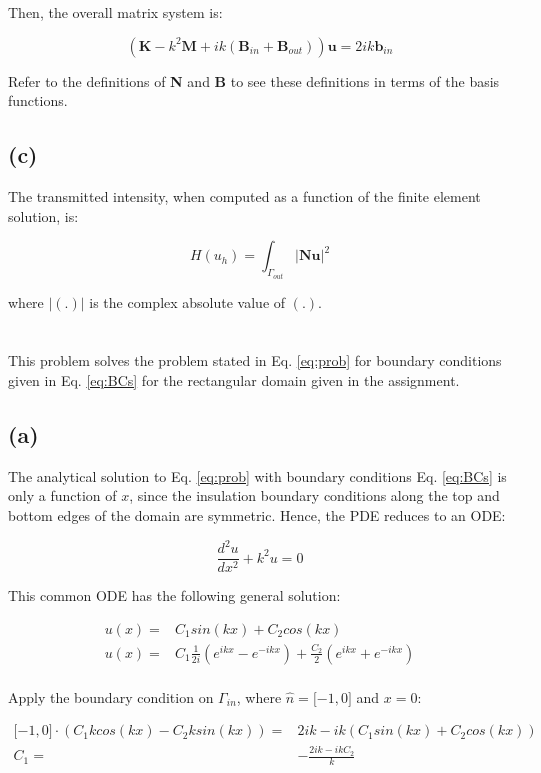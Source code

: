 \documentclass[10pt]{article}
\newcommand{\beq}{\begin{equation}}
\newcommand{\eeq}{\end{equation}}
\newcommand{\beqa}{\begin{equation}\begin{aligned}}
\newcommand{\eeqa}{\end{aligned}\end{equation}}
\begin{document}
Then, the overall matrix system is:

\beq
\left(\textbf{K}-k^2\textbf{M}+ik(\textbf{B}_{in}+\textbf{B}_{out})\right)\textbf{u}=2ik\textbf{b}_{in}
\eeq

Refer to the definitions of \textbf{N} and \textbf{B} to see these definitions in terms of the basis functions.

\subsection{(c)}

The transmitted intensity, when computed as a function of the finite element solution, is:

\beq
H(u_h)=\int_{\Gamma_{out}}|\textbf{N}\textbf{u}|^2
\eeq

where \(|(.)|\) is the complex absolute value of \((.)\). 

\section{}

This problem solves the problem stated in Eq. \eqref{eq:prob} for boundary conditions given in Eq. \eqref{eq:BCs} for the rectangular domain given in the assignment.

\subsection{(a)}

The analytical solution to Eq. \eqref{eq:prob} with boundary conditions Eq. \eqref{eq:BCs} is only a function of \(x\), since the insulation boundary conditions along the top and bottom edges of the domain are symmetric. Hence, the PDE reduces to an ODE:

\beq
\frac{d^2u}{dx^2}+k^2u=0
\eeq

This common ODE has the following general solution:

\beqa
u(x)=&C_1sin(kx)+C_2cos(kx)\\
u(x)=&C_1\frac{1}{2i}\left(e^{ikx}-e^{-ikx}\right)+\frac{C_2}{2}\left(e^{ikx}+e^{-ikx}\right)\\
\eeqa

Apply the boundary condition on \(\Gamma_{in}\), where \(\hat{n}=\lbrack -1, 0\rbrack\) and \(x=0\):

\beqa
\lbrack -1, 0\rbrack\cdot(C_1kcos(kx)-C_2ksin(kx))=&2ik-ik(C_1sin(kx)+C_2cos(kx))\\
C_1=&-\frac{2ik-ikC_2}{k}\\
\eeqa
\end{document}
